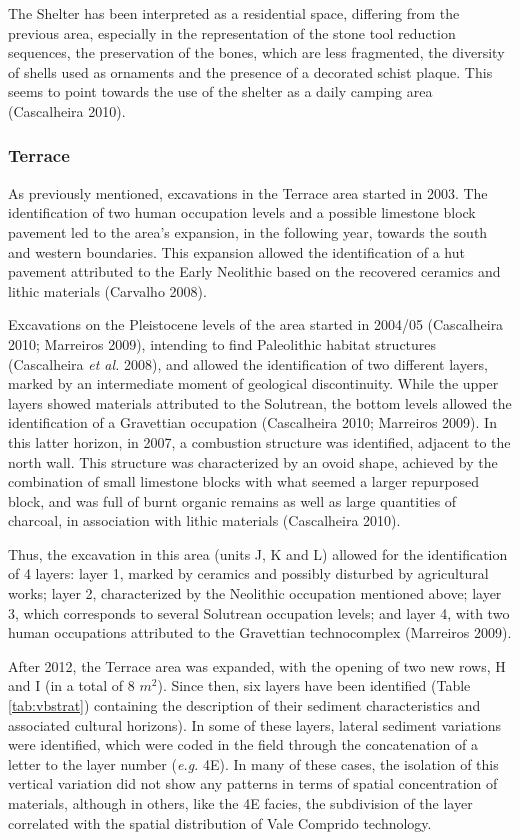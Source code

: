 \documentclass[12pt,twoside]{reedthesis}
\begin{document}
The Shelter has been interpreted as a residential space, differing from the previous area, especially in the representation of the stone tool reduction sequences, the preservation of the bones, which are less fragmented, the diversity of shells used as ornaments and the presence of a decorated schist plaque. This seems to point towards the use of the shelter as a daily camping area (Cascalheira 2010).

\hypertarget{terrace}{%
\subsubsection{Terrace}\label{terrace}}

As previously mentioned, excavations in the Terrace area started in 2003. The identification of two human occupation levels and a possible limestone block pavement led to the area's expansion, in the following year, towards the south and western boundaries. This expansion allowed the identification of a hut pavement attributed to the Early Neolithic based on the recovered ceramics and lithic materials (Carvalho 2008).

Excavations on the Pleistocene levels of the area started in 2004/05 (Cascalheira 2010; Marreiros 2009), intending to find Paleolithic habitat structures (Cascalheira \emph{et al.} 2008), and allowed the identification of two different layers, marked by an intermediate moment of geological discontinuity. While the upper layers showed materials attributed to the Solutrean, the bottom levels allowed the identification of a Gravettian occupation (Cascalheira 2010; Marreiros 2009). In this latter horizon, in 2007, a combustion structure was identified, adjacent to the north wall. This structure was characterized by an ovoid shape, achieved by the combination of small limestone blocks with what seemed a larger repurposed block, and was full of burnt organic remains as well as large quantities of charcoal, in association with lithic materials (Cascalheira 2010).

Thus, the excavation in this area (units J, K and L) allowed for the identification of 4 layers: layer 1, marked by ceramics and possibly disturbed by agricultural works; layer 2, characterized by the Neolithic occupation mentioned above; layer 3, which corresponds to several Solutrean occupation levels; and layer 4, with two human occupations attributed to the Gravettian technocomplex (Marreiros 2009).

After 2012, the Terrace area was expanded, with the opening of two new rows, H and I (in a total of 8 \(m^2\)). Since then, six layers have been identified (Table \ref{tab:vbstrat}) containing the description of their sediment characteristics and associated cultural horizons). In some of these layers, lateral sediment variations were identified, which were coded in the field through the concatenation of a letter to the layer number (\emph{e.g.} 4E). In many of these cases, the isolation of this vertical variation did not show any patterns in terms of spatial concentration of materials, although in others, like the 4E facies, the subdivision of the layer correlated with the spatial distribution of Vale Comprido technology.
\end{document}
